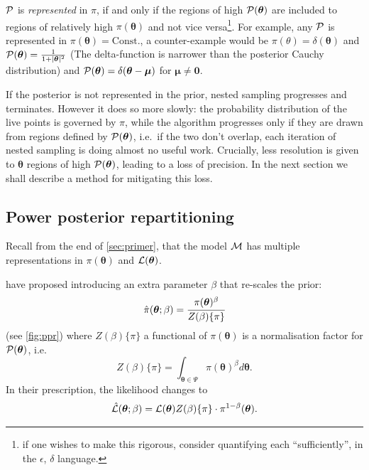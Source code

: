 \documentclass[usenatbib]{mnras}
\begin{document}
${\cal P}$ is \emph{represented} in $\pi$, if and only if the regions
of high ${\cal P}(\bm{\theta})$ are included to regions of relatively
high $\pi(\bm{\theta})$ and not vice versa\footnote{if one wishes to
  make this rigorous, consider quantifying each ``sufficiently'', in
  the $\epsilon$, $\delta$ language. }. For example, any ${\cal P}$ is
represented in $\pi(\bm{\theta}) = \text{Const.}$, a counter-example
would be $\pi(\theta) = \delta(\bm{\theta})$ and
${\cal P}(\bm{\theta}) = \frac{1}{1 + |\bm{\theta}|^{2}}$ (The
delta-function is narrower than the posterior Cauchy distribution) and
${\cal P}(\bm{\theta}) = \delta(\bm{\theta} - \bm{\mu})$ for
$\bm{\mu} \ne \bm{0}$.

If the posterior is not represented in the prior, nested sampling
progresses and terminates. However it does so more slowly: the
probability distribution of the live points is governed by $\pi$,
while the algorithm progresses only if they are drawn from regions
defined by \( {\cal P} (\bm{\theta})\), i.e.~if the two don't overlap,
each iteration of nested sampling is doing almost no useful
work. Crucially, less resolution is given to $\bm{\theta}$ regions of
high \( {\cal P} (\bm{\theta})\), leading to a loss of precision. In
the next section we shall describe a method for mitigating this loss.


\subsection{Power posterior repartitioning}\label{sec:autopr}

Recall from the end of \cref{sec:primer}, that the model ${\cal M}$
has multiple representations in \(\pi (\bm{\theta})\) and
\({\cal L}(\bm{\theta})\).

\citeauthor{chen-ferroz-hobson} have proposed introducing an
extra parameter \(\beta\) that re-scales the prior:
\begin{equation}
  \label{eq:autopr-prior}
  \hat{\pi}(\bm{\bm{\theta}};\beta) = \cfrac{\pi(\bm{\theta})^{\beta}}{Z(\beta)\{\pi\}}
\end{equation}
(see \cref{fig:ppr}) where \(Z(\beta)\{\pi\}\) a functional of
\(\pi (\bm{\theta})\) is a normalisation factor for
\( {\cal P} (\bm{\theta})\), i.e.
\begin{equation}
  Z(\beta)\{\pi\} = \int_{\bm{\theta} \in \Psi} \pi(\bm{\bm{\theta}})^{\beta}d\bm{\bm{\theta}}.
\end{equation}
In their prescription, the likelihood changes to
\begin{equation}
  \hat{\cal L}(\bm{\theta}; \beta) = {\cal L}(\bm{\theta}) Z(\beta)\{\pi\} \cdot \pi^{1-\beta}(\bm{\theta}).
\end{equation}
\end{document}
